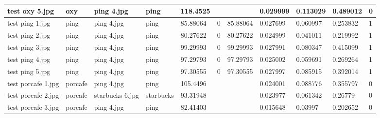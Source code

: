 \begin{landscape}
\begin{longtable}{|p{2cm}|p{1.5cm}|p{2cm}|p{1.5cm}|p{2cm}|p{1cm}|p{2cm}|p{2cm}|p{2cm}|p{2cm}|p{1cm}|}
		test oxy 5.jpg       & oxy              & ping 4.jpg            & ping                        & 118.4525              &                         &                            & 0.029999              & 0.113029              & 0.489012                 & 0                \\ \hline
		test ping 1.jpg      & ping             & ping 4.jpg            & ping                        & 85.88064              & 0                       & 85.88064                   & 0.027699              & 0.060997              & 0.253832                 & 1                \\ \hline
		test ping 2.jpg      & ping             & ping 4.jpg            & ping                        & 80.27622              & 0                       & 80.27622                   & 0.024999              & 0.041011              & 0.219992                 & 1                \\ \hline
		test ping 3.jpg      & ping             & ping 4.jpg            & ping                        & 99.29993              & 0                       & 99.29993                   & 0.027991              & 0.080347              & 0.415099                 & 1                \\ \hline
		test ping 4.jpg      & ping             & ping 4.jpg            & ping                        & 97.29793              & 0                       & 97.29793                   & 0.025002              & 0.059691              & 0.269264                 & 1                \\ \hline
		test ping 5.jpg      & ping             & ping 4.jpg            & ping                        & 97.30555              & 0                       & 97.30555                   & 0.027997              & 0.085915              & 0.392014                 & 1                \\ \hline
		test porcafe 1.jpg   & porcafe          & ping 4.jpg            & ping                        & 105.4496              &                         &                            & 0.024001              & 0.088776              & 0.355797                 & 0                \\ \hline
		test porcafe 2.jpg   & porcafe          & starbucks 6.jpg       & starbucks                   & 93.31948              &                         &                            & 0.023977              & 0.061342              & 0.26779                  & 0                \\ \hline
		test porcafe 3.jpg   & porcafe          & ping 4.jpg            & ping                        & 82.41403              &                         &                            & 0.015648              & 0.03997               & 0.202652                 & 0                \\ \hline

\end{longtable}
\end{landscape}
